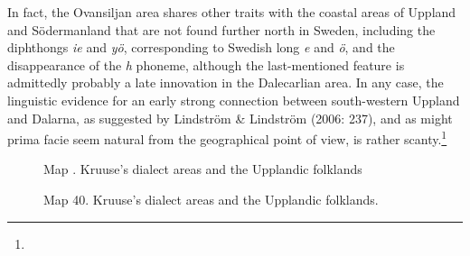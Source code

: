\begin{styleBodytextC}
In fact, the Ovansiljan area shares other traits with the coastal areas of Uppland and Södermanland that are not found further north in Sweden, including the diphthongs \textit{ie} and \textit{yö}, corresponding to Swedish long \textit{e} and \textit{ö}, and the disappearance of the \textit{h} phoneme, although the last-mentioned feature is admittedly probably a late innovation in the Dalecarlian area. In any case, the linguistic evidence for an early strong connection between south-western Uppland and Dalarna, as suggested by Lindström \& Lindström (2006: 237), and as might prima facie seem natural from the geographical point of view, is rather scanty.\footnote{}

\end{styleBodytextC}

\begin{styleContentsi}

\end{styleContentsi}

\begin{figure}[h]

\begin{minipage}{4.1252in}

\begin{styleFigureCaption}
Map . Kruuse’s dialect areas and the Upplandic folklands

\end{styleFigureCaption}

\end{minipage}

\end{figure}

\begin{styleFigureCaption}
   [Warning: Image ignored] %
 

\end{styleFigureCaption}

\begin{figure}[h]

\begin{minipage}{4.9272in}

\begin{styleFigureCaption}
Map 40. Kruuse’s dialect areas and the Upplandic folklands.

\end{styleFigureCaption}

\end{minipage}

\end{figure}

